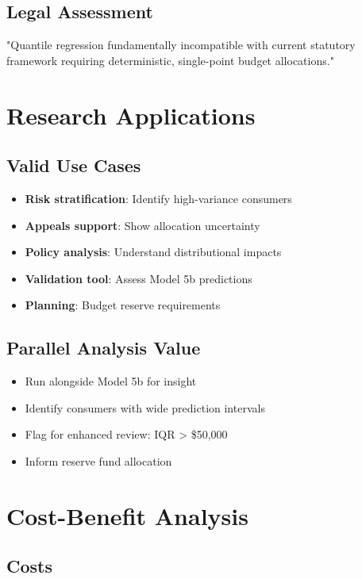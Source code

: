 \subsection{Legal Assessment}

"Quantile regression fundamentally incompatible with current statutory framework requiring deterministic, single-point budget allocations."

\section{Research Applications}

\subsection{Valid Use Cases}

\begin{itemize}
    \item \textbf{Risk stratification}: Identify high-variance consumers
    \item \textbf{Appeals support}: Show allocation uncertainty
    \item \textbf{Policy analysis}: Understand distributional impacts
    \item \textbf{Validation tool}: Assess Model 5b predictions
    \item \textbf{Planning}: Budget reserve requirements
\end{itemize}

\subsection{Parallel Analysis Value}

\begin{itemize}
    \item Run alongside Model 5b for insight
    \item Identify consumers with wide prediction intervals
    \item Flag for enhanced review: IQR > \$50,000
    \item Inform reserve fund allocation
\end{itemize}

\section{Cost-Benefit Analysis}

\subsection{Costs}

